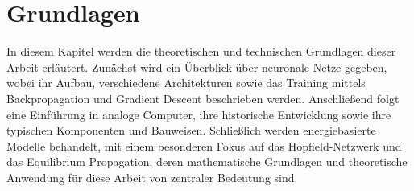 \newpage

\section{Grundlagen}

In diesem Kapitel werden die theoretischen und technischen Grundlagen dieser Arbeit erläutert. Zunächst wird ein Überblick über neuronale Netze gegeben, wobei ihr Aufbau, verschiedene Architekturen sowie das Training mittels Backpropagation und Gradient Descent beschrieben werden. Anschließend folgt eine Einführung in analoge Computer, ihre historische Entwicklung sowie ihre typischen Komponenten und Bauweisen. Schließlich werden energiebasierte Modelle behandelt, mit einem besonderen Fokus auf das Hopfield-Netzwerk und das Equilibrium Propagation, deren mathematische Grundlagen und theoretische Anwendung für diese Arbeit von zentraler Bedeutung sind.




